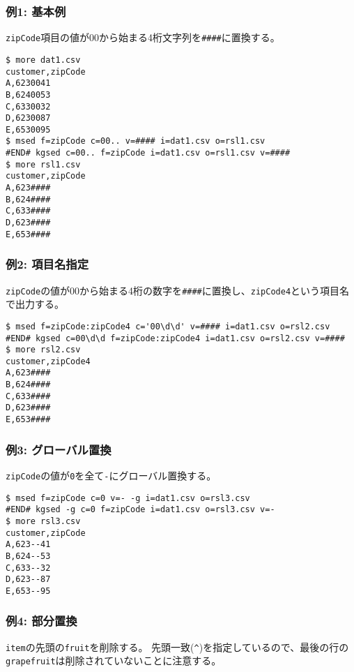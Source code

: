 \subsubsection*{例1: 基本例}

\verb|zipCode|項目の値が00から始まる4桁文字列を\verb|####|に置換する。


\begin{Verbatim}[baselinestretch=0.7,frame=single]
$ more dat1.csv
customer,zipCode
A,6230041
B,6240053
C,6330032
D,6230087
E,6530095
$ msed f=zipCode c=00.. v=#### i=dat1.csv o=rsl1.csv
#END# kgsed c=00.. f=zipCode i=dat1.csv o=rsl1.csv v=####
$ more rsl1.csv
customer,zipCode
A,623####
B,624####
C,633####
D,623####
E,653####
\end{Verbatim}
\subsubsection*{例2: 項目名指定}

\verb|zipCode|の値が00から始まる4桁の数字を\verb|####|に置換し、\verb|zipCode4|という項目名で出力する。


\begin{Verbatim}[baselinestretch=0.7,frame=single]
$ msed f=zipCode:zipCode4 c='00\d\d' v=#### i=dat1.csv o=rsl2.csv
#END# kgsed c=00\d\d f=zipCode:zipCode4 i=dat1.csv o=rsl2.csv v=####
$ more rsl2.csv
customer,zipCode4
A,623####
B,624####
C,633####
D,623####
E,653####
\end{Verbatim}
\subsubsection*{例3: グローバル置換}

\verb|zipCode|の値が\verb|0|を全て\verb|-|にグローバル置換する。


\begin{Verbatim}[baselinestretch=0.7,frame=single]
$ msed f=zipCode c=0 v=- -g i=dat1.csv o=rsl3.csv
#END# kgsed -g c=0 f=zipCode i=dat1.csv o=rsl3.csv v=-
$ more rsl3.csv
customer,zipCode
A,623--41
B,624--53
C,633--32
D,623--87
E,653--95
\end{Verbatim}
\subsubsection*{例4: 部分置換}

\verb|item|の先頭の\verb|fruit|を削除する。
先頭一致(\verb|^|)を指定しているので、最後の行の\verb|grapefruit|は削除されていないことに注意する。



